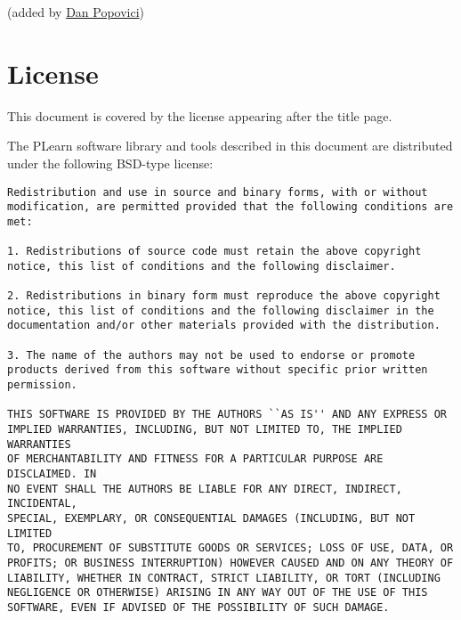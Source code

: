 \documentclass[11pt]{book}
\begin{document}
(added by \href{mailto:popovicd@iro.umontreal.ca}{Dan Popovici})




\chapter*{License}

This document is covered by the license appearing after the title page.

The PLearn software library and tools described in this document are
distributed under the following BSD-type license:

\begin{verbatim}
Redistribution and use in source and binary forms, with or without
modification, are permitted provided that the following conditions are met:

1. Redistributions of source code must retain the above copyright
notice, this list of conditions and the following disclaimer.

2. Redistributions in binary form must reproduce the above copyright
notice, this list of conditions and the following disclaimer in the
documentation and/or other materials provided with the distribution.

3. The name of the authors may not be used to endorse or promote
products derived from this software without specific prior written
permission.

THIS SOFTWARE IS PROVIDED BY THE AUTHORS ``AS IS'' AND ANY EXPRESS OR
IMPLIED WARRANTIES, INCLUDING, BUT NOT LIMITED TO, THE IMPLIED WARRANTIES
OF MERCHANTABILITY AND FITNESS FOR A PARTICULAR PURPOSE ARE DISCLAIMED. IN
NO EVENT SHALL THE AUTHORS BE LIABLE FOR ANY DIRECT, INDIRECT, INCIDENTAL,
SPECIAL, EXEMPLARY, OR CONSEQUENTIAL DAMAGES (INCLUDING, BUT NOT LIMITED
TO, PROCUREMENT OF SUBSTITUTE GOODS OR SERVICES; LOSS OF USE, DATA, OR
PROFITS; OR BUSINESS INTERRUPTION) HOWEVER CAUSED AND ON ANY THEORY OF
LIABILITY, WHETHER IN CONTRACT, STRICT LIABILITY, OR TORT (INCLUDING
NEGLIGENCE OR OTHERWISE) ARISING IN ANY WAY OUT OF THE USE OF THIS
SOFTWARE, EVEN IF ADVISED OF THE POSSIBILITY OF SUCH DAMAGE.
\end{verbatim}
\end{document}

